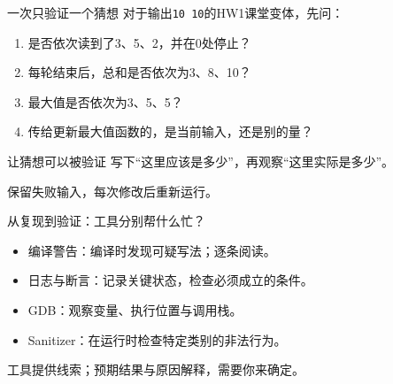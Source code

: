 \begin{frame}{一次只验证一个猜想}
    对于输出\texttt{10 10}的HW1课堂变体，先问：
    \begin{enumerate}
        \item 是否依次读到了3、5、2，并在0处停止？
        \item 每轮结束后，总和是否依次为3、8、10？
        \item 最大值是否依次为3、5、5？
        \item 传给更新最大值函数的，是当前输入，还是别的量？
    \end{enumerate}
    \medskip
    \begin{vspquotered}{让猜想可以被验证}
        写下“这里应该是多少”，再观察“这里实际是多少”。\par
        保留失败输入，每次修改后重新运行。
    \end{vspquotered}
\end{frame}

\begin{frame}{从复现到验证：工具分别帮什么忙？}
    \begin{center}
    \end{center}
    \begin{itemize}
        \item \alert{编译警告}：编译时发现可疑写法；逐条阅读。
        \item \alert{日志与断言}：记录关键状态，检查必须成立的条件。
        \item \alert{GDB}：观察变量、执行位置与调用栈。
        \item \alert{Sanitizer}：在运行时检查特定类别的非法行为。
    \end{itemize}
    工具提供线索；预期结果与原因解释，需要你来确定。
\end{frame}

